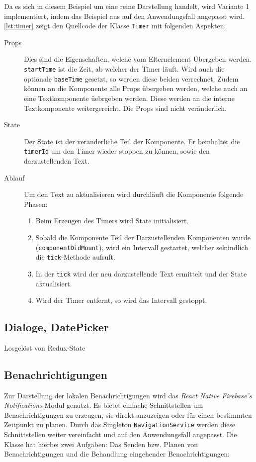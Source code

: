 Da es sich in diesem Beispiel um eine reine Darstellung handelt,
wird Variante 1 implementiert, indem das Beispiel aus \cite{Timersin85:online} auf den Anwendungsfall angepasst wird.
\autoref{lst:timer} zeigt den Quellcode der Klasse \texttt{Timer} mit folgenden Aspekten:
\begin{description}
    \item[Props] Dies sind die Eigenschaften, welche vom Elternelement Übergeben werden.
    \texttt{startTime} ist die Zeit, ab welcher der Timer läuft.
    Wird auch die optionale \texttt{baseTime} gesetzt, so werden diese beiden verrechnet.
    Zudem können an die Komponente alle Props übergeben werden, welche auch an eine Textkomponente üebrgeben werden.
    Diese werden an die interne Textkomponente weitergereicht.
    Die Props sind nicht veränderlich.
    \item[State] Der State ist der veränderliche Teil der Komponente.
    Er beinhaltet die \texttt{timerId} um den Timer wieder stoppen zu können,
    sowie den darzustellenden Text.
    \item[Ablauf]
    Um den Text zu aktualisieren wird durchläuft die Komponente folgende Phasen:
    \begin{enumerate}
        \item Beim Erzeugen des Timers wird State initialisiert.
        \item Sobald die Komponente Teil der Darzustellenden Komponenten wurde (\texttt{componentDidMount}),
        wird ein Intervall gestartet, welcher sekündlich die \texttt{tick}-Methode aufruft.
        \item In der \texttt{tick} wird der neu darzustellende Text ermittelt und der State aktualisiert.
        \item Wird der Timer entfernt, so wird das Intervall gestoppt.
    \end{enumerate}
\end{description}




\subsection{Dialoge, DatePicker}
Losgelöst von Redux-State

\subsection{Benachrichtigungen}\label{sec:besonderheiten-benachrichtigung}
Zur Darstellung der lokalen Benachrichtigungen wird das \emph{React Native Firebase's Notifications}-Modul genutzt.
Es bietet einfache Schnittstellen um Benachrichtigungen zu erzeugen,
sie direkt anzuzeigen oder für einen bestimmten Zeitpunkt zu planen.
Durch das Singleton \texttt{NavigationService} werden diese Schnittstellen weiter vereinfacht und auf den Anwendungsfall angepasst.
Die Klasse hat hierbei zwei Aufgaben: Das Senden bzw. Planen von Benachrichtigungen und die Behandlung eingehender Benachrichtigungen:

